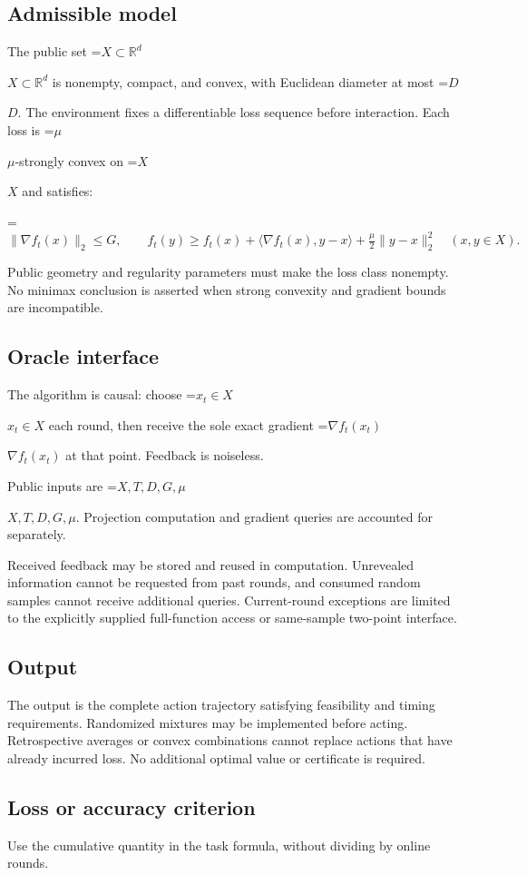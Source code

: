 \documentclass[10pt,a4paper]{article}
\newcommand{\AtlasMath}[1]{\par\begingroup\centering\setbox0=\hbox{$\displaystyle #1$}\ifdim\wd0>1.4\linewidth\typeout{ATLAS WIDE FORMULA: \the\wd0}\fi\ifdim\wd0>\linewidth\resizebox{\linewidth}{!}{\box0}\else\box0\fi\par\endgroup}
\newcommand{\AtlasInlineMath}[1]{\begingroup\setbox0=\hbox{$#1$}\ifdim\wd0>.4\linewidth\endgroup\AtlasMath{#1}\else\endgroup$#1$\fi}
\begin{document}
\subsection{Admissible model}
The public set \AtlasInlineMath{X\subset\mathbb{R}^d} is nonempty, compact, and convex, with Euclidean diameter at most \AtlasInlineMath{D}. The environment fixes a differentiable loss sequence before interaction. Each loss is \AtlasInlineMath{\mu}-strongly convex on \AtlasInlineMath{X} and satisfies:


\AtlasMath{\|\nabla f_t(x)\|_2\le G,\qquad f_t(y)\ge f_t(x)+\langle\nabla f_t(x),y-x\rangle+\frac{\mu}{2}\|y-x\|_2^2\quad(x,y\in X).}


Public geometry and regularity parameters must make the loss class nonempty. No minimax conclusion is asserted when strong convexity and gradient bounds are incompatible.

\subsection{Oracle interface}
The algorithm is causal: choose \AtlasInlineMath{x_t\in X} each round, then receive the sole exact gradient \AtlasInlineMath{\nabla f_t(x_t)} at that point. Feedback is noiseless.

Public inputs are \AtlasInlineMath{X,T,D,G,\mu}. Projection computation and gradient queries are accounted for separately.

Received feedback may be stored and reused in computation. Unrevealed information cannot be requested from past rounds, and consumed random samples cannot receive additional queries. Current-round exceptions are limited to the explicitly supplied full-function access or same-sample two-point interface.

\subsection{Output}
The output is the complete action trajectory satisfying feasibility and timing requirements. Randomized mixtures may be implemented before acting. Retrospective averages or convex combinations cannot replace actions that have already incurred loss. No additional optimal value or certificate is required.

\subsection{Loss or accuracy criterion}
Use the cumulative quantity in the task formula, without dividing by online rounds.
\end{document}
